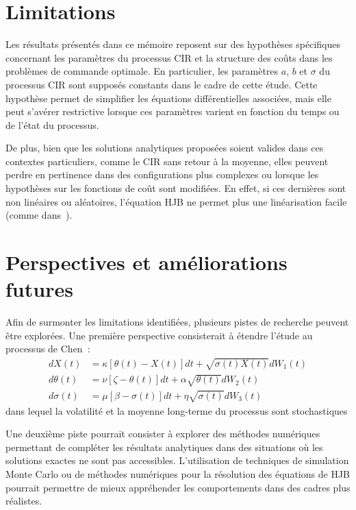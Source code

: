\section{Limitations}

Les résultats présentés dans ce mémoire reposent sur des hypothèses spécifiques concernant les paramètres du processus CIR et la structure des coûts dans les problèmes de commande optimale. En particulier, les paramètres \(a\), \(b\) et \(\sigma\) du processus \acs{CIR} sont supposés constants dans le cadre de cette étude. Cette hypothèse permet de simplifier les équations différentielles associées, mais elle peut s'avérer restrictive lorsque ces paramètres varient en fonction du temps ou de l'état du processus. 

De plus, bien que les solutions analytiques proposées soient valides dans ces contextes particuliers, comme le \acs{CIR} sans retour à la moyenne, elles peuvent perdre en pertinence dans des configurations plus complexes ou lorsque les hypothèses sur les fonctions de coût sont modifiées. En effet, si ces dernières sont non linéaires ou aléatoires, l'équation \acs{HJB} ne permet plus une linéarisation facile (comme dans~\cite{whittle1982}).

\section{Perspectives et améliorations futures}

Afin de surmonter les limitations identifiées, plusieurs pistes de recherche peuvent être explorées. Une première perspective consisterait à étendre l'étude au processus de Chen~\cite{chen1996}:
\[
\begin{aligned}
    dX(t) &= \kappa[\theta(t)-X(t)]dt+\sqrt{\sigma(t)X(t)}dW_1(t) \\
    d\theta(t) &= \nu[\zeta-\theta(t)]dt+\alpha\sqrt{\theta(t)}dW_2(t) \\
    d\sigma(t) &= \mu[\beta-\sigma(t)]dt+\eta\sqrt{\sigma(t)}dW_3(t)
\end{aligned}
\]
dans lequel la volatilité et la moyenne long-terme du processus sont stochastiques

Une deuxième piste pourrait consister à explorer des méthodes numériques permettant de compléter les résultats analytiques dans des situations où les solutions exactes ne sont pas accessibles. L'utilisation de techniques de simulation Monte Carlo ou de méthodes numériques pour la résolution des équations de \acs{HJB} pourrait permettre de mieux appréhender les comportements dans des cadres plus réalistes.


